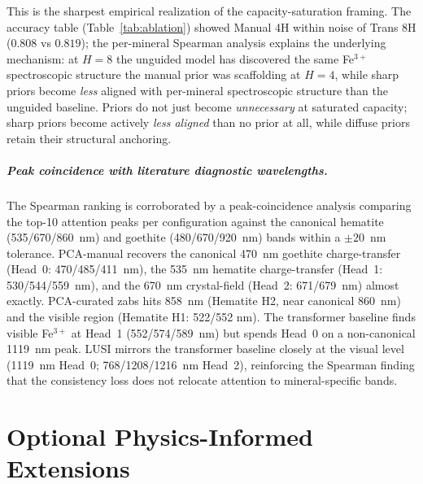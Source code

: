 \documentclass[11pt]{report}
\begin{document}
This is the sharpest empirical realization of the capacity-saturation framing. The accuracy table (Table~\ref{tab:ablation}) showed Manual 4H within noise of Trans 8H ($0.808$ vs $0.819$); the per-mineral Spearman analysis explains the underlying mechanism: at $H = 8$ the unguided model has discovered the same Fe$^{3+}$ spectroscopic structure the manual prior was scaffolding at $H = 4$, while sharp priors become \emph{less} aligned with per-mineral spectroscopic structure than the unguided baseline. Priors do not just become \emph{unnecessary} at saturated capacity; sharp priors become actively \emph{less aligned} than no prior at all, while diffuse priors retain their structural anchoring.

\paragraph{Peak coincidence with literature diagnostic wavelengths.}
The Spearman ranking is corroborated by a peak-coincidence analysis comparing the top-10 attention peaks per configuration against the canonical hematite (535/670/860~nm) and goethite (480/670/920~nm) bands within a $\pm 20$~nm tolerance. PCA-manual recovers the canonical 470~nm goethite charge-transfer (Head~0: 470/485/411~nm), the 535~nm hematite charge-transfer (Head~1: 530/544/559~nm), and the 670~nm crystal-field (Head~2: 671/679~nm) almost exactly. PCA-curated zabs hits 858~nm (Hematite H2, near canonical 860~nm) and the visible region (Hematite H1: 522/552 nm). The transformer baseline finds visible Fe$^{3+}$ at Head~1 (552/574/589~nm) but spends Head~0 on a non-canonical 1119~nm peak. LUSI mirrors the transformer baseline closely at the visual level (1119~nm Head~0; 768/1208/1216~nm Head~2), reinforcing the Spearman finding that the consistency loss does not relocate attention to mineral-specific bands.


\chapter{Optional Physics-Informed Extensions}
\label{chap:phys_extensions}
\end{document}
